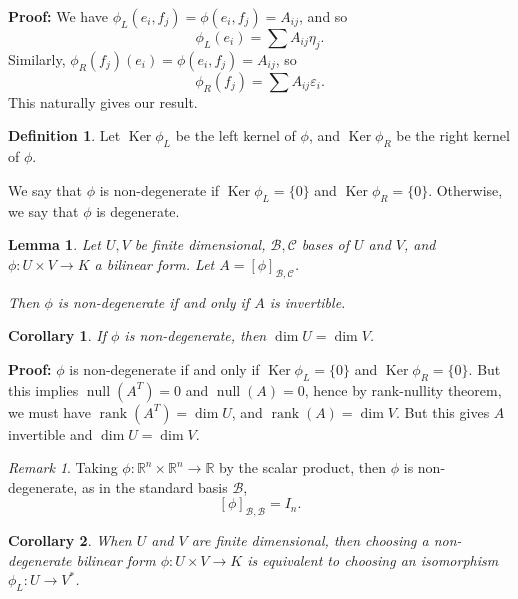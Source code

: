 \documentclass[12pt]{article}
\DeclareMathOperator{\Ker}{Ker}
\DeclareMathOperator{\rank}{rank}
\DeclareMathOperator{\nullity}{null}
\newtheorem{corollary}{Corollary}[section]
\newtheorem{lemma}{Lemma}[section]
\theoremstyle{definition}
\newtheorem{definition}{Definition}[section]
\theoremstyle{remark}
\newtheorem*{remark}{Remark}
\begin{document}
\begin{adjustbox}{minipage = \columnwidth - 25.5pt, margin=1em, frame=1pt, margin=0em}
	\textbf{Proof:} We have $\phi_L(e_i, f_j) = \phi(e_i, f_j) = A_{ij}$, and so
	\[
		\phi_L(e_i) = \sum A_{ij} \eta_j
	.\]
	Similarly, $\phi_R(f_j)(e_i) = \phi(e_i, f_j) = A_{ij}$, so
	\[
		\phi_R(f_{j}) = \sum A_{ij} \varepsilon_i
	.\]
	This naturally gives our result.
\end{adjustbox}

\begin{definition}
	Let $\Ker \phi_L$ be the left kernel of $\phi$, and $\Ker \phi_R$ be the right kernel of $\phi$.

	We say that $\phi$ is non-degenerate if $\Ker \phi_L = \{0\}$ and $\Ker \phi_R = \{0\}$. Otherwise, we say that $\phi$ is degenerate.
\end{definition}

\begin{lemma}
	Let $U, V$ be finite dimensional, $\mathcal{B}, \mathcal{C}$ bases of $U$ and $V$, and $\phi: U \times V \to K$ a bilinear form. Let $A = [\phi]_{\mathcal{B}, \mathcal{C}}$.

	Then $\phi$ is non-degenerate if and only if $A$ is invertible.
\end{lemma}

\begin{corollary}
	If $\phi$ is non-degenerate, then $\dim U = \dim V$.
\end{corollary}

\begin{adjustbox}{minipage = \columnwidth - 25.5pt, margin=1em, frame=1pt, margin=0em}
	\textbf{Proof:} $\phi$ is non-degenerate if and only if $\Ker \phi_L = \{0\}$ and $\Ker \phi_R = \{0\}$. But this implies $\nullity (A^{T}) = 0$ and $\nullity (A) = 0$, hence by rank-nullity theorem, we must have $\rank (A^{T}) = \dim U$, and $\rank (A) = \dim V$. But this gives $A$ invertible and $\dim U = \dim V$.
\end{adjustbox}

\begin{remark}
	Taking $\phi : \mathbb{R}^{n} \times \mathbb{R}^{n} \to \mathbb{R}$ by the scalar product, then $\phi$ is non-degenerate, as in the standard basis $\mathcal{B}$,
	\[
		[\phi]_{\mathcal{B}, \mathcal{B}} = I_n
	.\]
\end{remark}

\begin{corollary}
	When $U$ and $V$ are finite dimensional, then choosing a non-degenerate bilinear form $\phi: U \times V \to K$ is equivalent to choosing an isomorphism $\phi_L : U \to V^{\ast}$.
\end{corollary}
\end{document}
